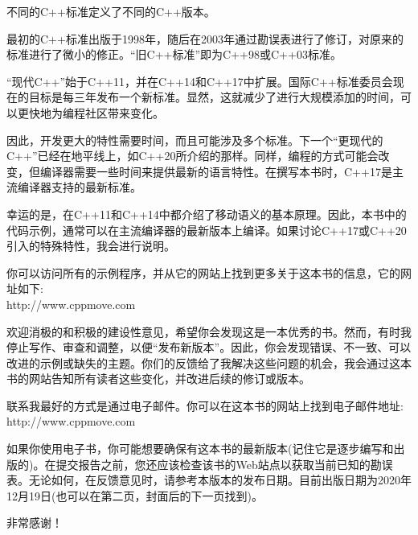 
不同的C++标准定义了不同的C++版本。\par

最初的C++标准出版于1998年，随后在2003年通过勘误表进行了修订，对原来的标准进行了微小的修正。“旧C++标准”即为C++98或C++03标准。\par

“现代C++”始于C++11，并在C++14和C++17中扩展。国际C++标准委员会现在的目标是每三年发布一个新标准。显然，这就减少了进行大规模添加的时间，可以更快地为编程社区带来变化。\par

因此，开发更大的特性需要时间，而且可能涉及多个标准。下一个“更现代的C++”已经在地平线上，如C++20所介绍的那样。同样，编程的方式可能会改变，但编译器需要一些时间来提供最新的语言特性。在撰写本书时，C++17是主流编译器支持的最新标准。\par

幸运的是，在C++11和C++14中都介绍了移动语义的基本原理。因此，本书中的代码示例，通常可以在主流编译器的最新版本上编译。如果讨论C++17或C++20引入的特殊特性，我会进行说明。\par


你可以访问所有的示例程序，并从它的网站上找到更多关于这本书的信息，它的网址如下:\\http://www.cppmove.com\par


欢迎消极的和积极的建设性意见，希望你会发现这是一本优秀的书。然而，有时我停止写作、审查和调整，以便“发布新版本”。因此，你会发现错误、不一致、可以改进的示例或缺失的主题。你们的反馈给了我解决这些问题的机会，我会通过这本书的网站告知所有读者这些变化，并改进后续的修订或版本。\par

联系我最好的方式是通过电子邮件。你可以在这本书的网站上找到电子邮件地址:\\http://www.cppmove.com\par

如果你使用电子书，你可能想要确保有这本书的最新版本(记住它是逐步编写和出版的)。在提交报告之前，您还应该检查该书的Web站点以获取当前已知的勘误表。无论如何，在反馈意见时，请参考本版本的发布日期。目前出版日期为2020年12月19日(也可以在第二页，封面后的下一页找到)。\par

非常感谢！\par
